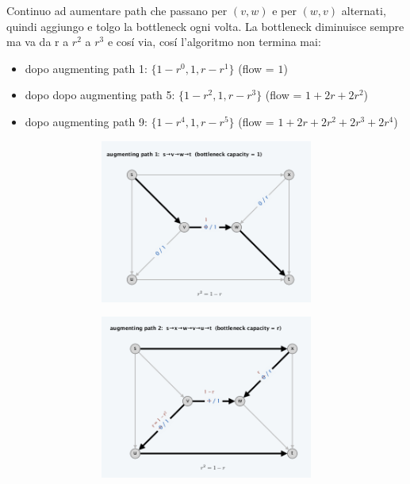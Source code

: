 Continuo ad aumentare path che passano per $(v,w)$ e per $(w,v)$ alternati,
quindi aggiungo e tolgo la bottleneck ogni volta. La bottleneck
diminuisce sempre ma va da r a $r^2$ a $r^3$ e cosí via, cosí
l'algoritmo non termina mai:
\begin{itemize}
	\item dopo augmenting path 1: $\{ 1 - r^0, 1, r - r^1 \}$ (flow = $1$)
	\item dopo dopo augmenting path 5: $\{ 1 - r^2, 1, r - r^3 \}$ (flow = $1 + 2r + 2r^2$)
	\item dopo augmenting path 9: $\{ 1 - r^4, 1, r - r^5 \}$ (flow = $1 + 2r + 2r^2 + 2r^3 + 2r^4$)\\
\end{itemize}
\begin{figure}[H]
	\begin{subfigure}{\textwidth}
		\centering
		\begin{subfigure}{.33\textwidth}
			\centering
			\includegraphics[width=\linewidth]{capitoli/network_flow/imgs/ex1.png}
		\end{subfigure}%
		\begin{subfigure}{.33\textwidth}
			\centering
			\includegraphics[width=\linewidth]{capitoli/network_flow/imgs/ex2.png}

\end{subfigure}
\end{subfigure}
\end{figure}
